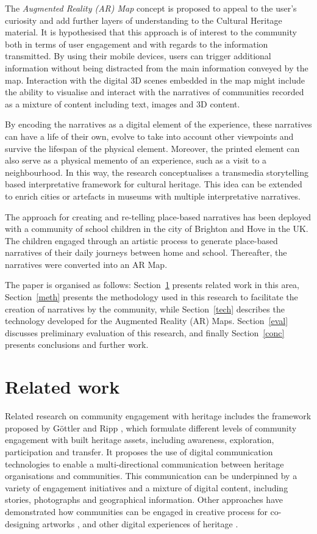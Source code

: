 \documentclass[acmlarge,screen,dvipsnames]{acmart}
\begin{document}
The \emph{Augmented Reality (AR) Map} concept is proposed to appeal to the
user's curiosity and add further layers of understanding to the Cultural
Heritage material. It is hypothesised that this approach is of interest to the
community both in terms of user engagement and with regards to the information
transmitted. By using their mobile devices, users can trigger additional
information without being distracted from the main information conveyed by the
map. Interaction with the digital 3D scenes embedded in the map might include
the ability to visualise and interact with the narratives of communities
recorded as a mixture of content including text, images and 3D content. 

By encoding the narratives as a digital element of the experience, these
narratives can have a life of their own, evolve to take into account other
viewpoints and survive the lifespan of the physical element. Moreover, the
printed element can also serve as a physical memento of an experience, such as
a visit to a neighbourhood. In this way, the research conceptualises a
transmedia storytelling based interpretative framework for cultural heritage.
This idea can be extended to enrich cities or artefacts in museums with
multiple interpretative narratives.

The approach for creating and re-telling place-based narratives has been
deployed with a community of school children in the city of Brighton and Hove
in the UK. The children engaged through an artistic process to generate
place-based narratives of their daily journeys between home and school.
Thereafter, the narratives were converted into an AR Map.

The paper is organised as follows: Section~\ref{ref} presents related work in
this area, Section~\ref{meth} presents the methodology used in this research
to facilitate the creation of narratives by the community, while
Section~\ref{tech} describes the technology developed for the Augmented
Reality (AR) Maps. Section~\ref{eval} discusses preliminary evaluation of this
research, and finally Section~\ref{conc} presents conclusions and further
work.


\section{Related work} 
\label{ref}
Related research on community engagement
with heritage includes the framework proposed by G{\"o}ttler and Ripp
\cite{icomos1812}, which formulate different levels of community engagement
with built heritage assets, including awareness, exploration, participation
and transfer. It proposes the use of digital communication technologies to
enable a multi-directional communication between heritage organisations and
communities. This communication can be underpinned by a variety of engagement
initiatives and a mixture of digital content, including stories, photographs
and geographical information. Other approaches have demonstrated how
communities can be engaged in creative process for co-designing artworks
\cite{656aab9e240d4479bf2872665a590233}, and other digital experiences of
heritage \cite{ Avram:2019:CGL:3358680.3348793, Fox:2014:CHS:2598510.2598563,
Albouys-Perrois:2018:TMA:3173574.3174203}. 
\end{document}
